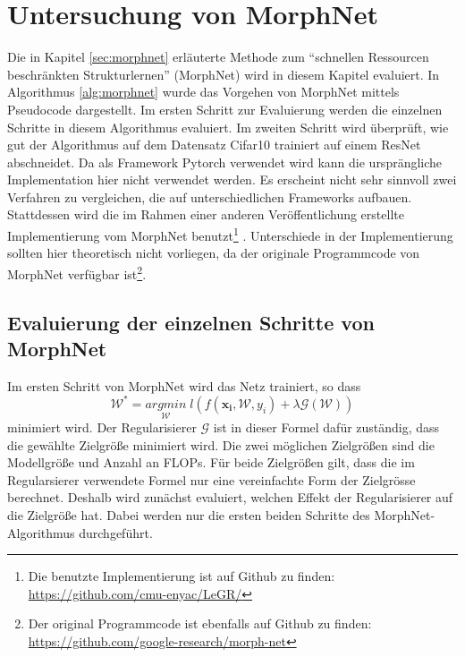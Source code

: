 \chapter{Untersuchung von MorphNet}\label{sec:morphexperimente}

Die in Kapitel \ref{sec:morphnet} erläuterte Methode zum ``schnellen Ressourcen beschränkten Strukturlernen'' (MorphNet) wird in diesem Kapitel evaluiert. In Algorithmus \ref{alg:morphnet} wurde das Vorgehen von MorphNet mittels Pseudocode dargestellt. Im ersten Schritt zur Evaluierung werden die einzelnen Schritte in diesem Algorithmus evaluiert. Im zweiten Schritt wird überprüft, wie gut der Algorithmus auf dem Datensatz Cifar10 trainiert auf einem ResNet abschneidet.
Da als Framework Pytorch verwendet wird kann die ursprängliche Implementation hier nicht verwendet werden. Es erscheint nicht sehr sinnvoll zwei Verfahren zu vergleichen, die auf unterschiedlichen Frameworks aufbauen. Stattdessen wird die im Rahmen einer anderen Veröffentlichung erstellte Implementierung vom MorphNet benutzt\footnote{Die benutzte Implementierung ist auf Github zu finden: \url{https://github.com/cmu-enyac/LeGR/} } \cite{morphImple}. Unterschiede in der Implementierung sollten hier theoretisch nicht vorliegen, da der originale Programmcode von MorphNet verfügbar ist\footnote{Der original Programmcode ist ebenfalls auf Github zu finden: \url{https://github.com/google-research/morph-net}}.

\section{Evaluierung der einzelnen Schritte von MorphNet}
Im ersten Schritt von MorphNet wird das Netz trainiert, so dass
\begin{equation}
\mathcal{W}^{\ast}=\underset{\mathcal{W}}{arg min}\; l(f(\mathbf{x_i}, \mathcal{W},y_i) + \lambda \mathcal{G}(\mathcal{W}))
\end{equation}
minimiert wird. Der Regularisierer $\mathcal{G}$ ist in dieser Formel dafür zuständig, dass die gewählte Zielgröße minimiert wird. Die zwei möglichen Zielgrößen sind die Modellgröße und Anzahl an FLOPs. Für beide Zielgrößen gilt, dass die im Regularsierer verwendete Formel nur eine vereinfachte Form der Zielgrösse berechnet. 
Deshalb wird zunächst evaluiert, welchen Effekt der Regularisierer auf die Zielgröße hat. Dabei werden nur die ersten beiden Schritte des MorphNet-Algorithmus durchgeführt.



